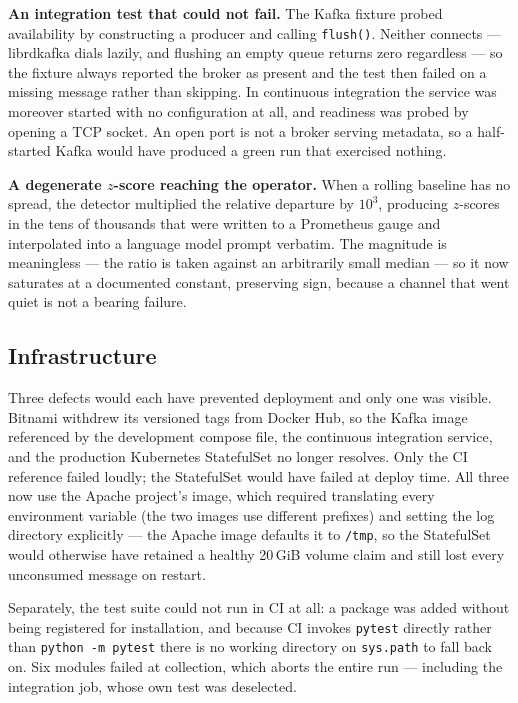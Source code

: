 \documentclass[11pt]{article}
\begin{document}
\textbf{An integration test that could not fail.} The Kafka fixture probed
availability by constructing a producer and calling \texttt{flush()}. Neither
connects --- librdkafka dials lazily, and flushing an empty queue returns zero
regardless --- so the fixture always reported the broker as present and the test
then failed on a missing message rather than skipping. In continuous
integration the service was moreover started with no configuration at all, and
readiness was probed by opening a TCP socket. An open port is not a broker
serving metadata, so a half-started Kafka would have produced a green run that
exercised nothing.

\textbf{A degenerate $z$-score reaching the operator.} When a rolling baseline
has no spread, the detector multiplied the relative departure by $10^3$,
producing $z$-scores in the tens of thousands that were written to a Prometheus
gauge and interpolated into a language model prompt verbatim. The magnitude is
meaningless --- the ratio is taken against an arbitrarily small median --- so it
now saturates at a documented constant, preserving sign, because a channel that
went quiet is not a bearing failure.

\subsection{Infrastructure}

Three defects would each have prevented deployment and only one was visible.
Bitnami withdrew its versioned tags from Docker Hub, so the Kafka image
referenced by the development compose file, the continuous integration service,
and the production Kubernetes StatefulSet no longer resolves. Only the CI
reference failed loudly; the StatefulSet would have failed at deploy time. All
three now use the Apache project's image, which required translating every
environment variable (the two images use different prefixes) and setting the log
directory explicitly --- the Apache image defaults it to \texttt{/tmp}, so the
StatefulSet would otherwise have retained a healthy 20\,GiB volume claim and
still lost every unconsumed message on restart.

Separately, the test suite could not run in CI at all: a package was added
without being registered for installation, and because CI invokes
\texttt{pytest} directly rather than \texttt{python -m pytest} there is no
working directory on \texttt{sys.path} to fall back on. Six modules failed at
collection, which aborts the entire run --- including the integration job, whose
own test was deselected.
\end{document}
